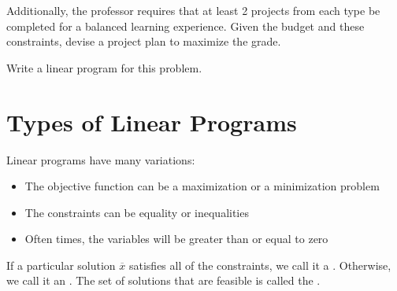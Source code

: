 \documentclass[11  pt]{article}
\begin{document}
Additionally, the professor requires that at least 2 projects from each type be completed for a balanced learning experience.
Given the budget and these constraints, devise a project plan to maximize the grade. 

\vs{1cm}
Write a linear program for this problem.

\vfill
\newpage

%
%
%

\section{Types of Linear Programs}
Linear programs have many variations:
\begin{itemize}
	\item The objective function can be a maximization or a minimization problem
	\item The constraints can be equality or inequalities
	\item Often times, the variables will be greater than or equal to zero
\end{itemize}

If a particular solution $\overline{x}$ satisfies all of the constraints, we call it a . 
Otherwise, we call it an .
The set of solutions that are feasible is called the .
\end{document}
